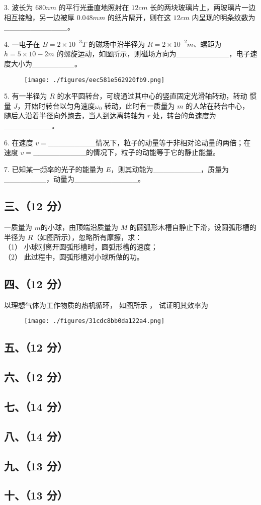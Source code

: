 3. 波长为 $680nm$ 的平行光垂直地照射在 $12cm$ 长的两块玻璃片上，两玻璃片一边相互接触，另一边被厚 $0.048mm$ 的纸片隔开，则在这 $12cm$ 内呈现的明条纹数为____________。

4. 一电子在 $B=2\times10^{-3}T$ 的磁场中沿半径为 $R=2\times10^{-2}m$、螺距为 $h=5\times10-2m$ 的螺旋运动，如图所示，则磁场方向为__________，电子速度大小为________。
\begin{figure}[ht]
\centering
\texttt{[image: ./figures/eec581e562920fb9.png]}
\caption{} \label{fig_NJUD4_2}
\end{figure}
5. 有一半径为 $R$ 的水平圆转台，可绕通过其中心的竖直固定光滑轴转动，转动
惯量 $J$，开始时转台以匀角速度$\omega_0$ 转动，此时有一质量为 $m$ 的人站在转台中心，
随后人沿着半径向外跑去，当人到达离转轴为 $r$ 处，转台的角速度为_________。

6. 在速度 $v=$_________情况下，粒子的动量等于非相对论动量的两倍；在速度
$v=$__________的情况下，粒子的动能等于它的静止能量。

7. 已知某一频率的光子的能量为 $E$，则其动能为_________，质量为________，动量为____________。
\subsection{三、（12 分）}
一质量为 $m$的小球，由顶端沿质量为 $M$ 的圆弧形木槽自静止下滑，设圆弧形槽的半径为 $R$（如图所示），忽略所有摩擦，求：\\
（1） 小球刚离开圆弧形槽时，圆弧形槽的速度；\\
（2） 此过程中，圆弧形槽对小球所做的功。
\subsection{四、（12 分）}
以理想气体为工作物质的热机循环， 如图所示 ， 试证明其效率为
\begin{figure}[ht]
\centering
\texttt{[image: ./figures/31cdc8bb0da122a4.png]}
\caption{} \label{fig_NJUD4_3}
\end{figure}
\subsection{五、（12 分）}

\subsection{六、（12 分）}

\subsection{七、（14 分）}

\subsection{八、（14 分）}

\subsection{九、（13 分）}

\subsection{十、（13 分）}